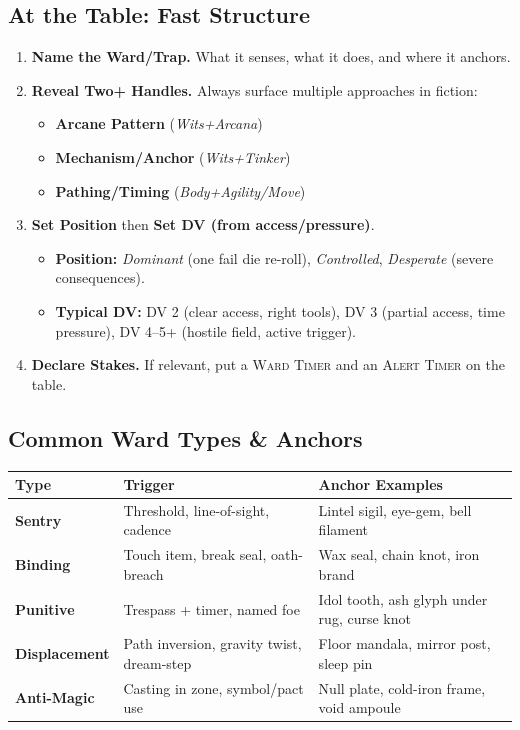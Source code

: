\subsection*{At the Table: Fast Structure}
\begin{enumerate}[label=\textbf{Step~\arabic*:}, leftmargin=2.1em]
    \item \textbf{Name the Ward/Trap.} What it senses, what it does, and where it anchors.
    \item \textbf{Reveal Two+ Handles.} Always surface multiple approaches in fiction:
        \begin{itemize}
            \item \textbf{Arcane Pattern} (\emph{Wits+Arcana})
            \item \textbf{Mechanism/Anchor} (\emph{Wits+Tinker})
            \item \textbf{Pathing/Timing} (\emph{Body+Agility/Move})
        \end{itemize}
    \item \textbf{Set Position} then \textbf{Set DV (from access/pressure)}.
        \begin{itemize}
            \item \textbf{Position:} \emph{Dominant} (one fail die re-roll), \emph{Controlled}, \emph{Desperate} (severe consequences).
            \item \textbf{Typical DV:} DV 2 (clear access, right tools), DV 3 (partial access, time pressure), DV 4--5+ (hostile field, active trigger).
        \end{itemize}
    \item \textbf{Declare Stakes.} If relevant, put a \textsc{Ward Timer } and an \textsc{Alert Timer } on the table.
\end{enumerate}

\subsection*{Common Ward Types \& Anchors}
\begin{tabularx}{\linewidth}{>{\bfseries}l X X}
\toprule
Type & Trigger & Anchor Examples \\
\midrule
Sentry & Threshold, line-of-sight, cadence & Lintel sigil, eye-gem, bell filament \\
Binding & Touch item, break seal, oath-breach & Wax seal, chain knot, iron brand \\
Punitive & Trespass + timer, named foe & Idol tooth, ash glyph under rug, curse knot \\
Displacement & Path inversion, gravity twist, dream-step & Floor mandala, mirror post, sleep pin \\
Anti-Magic & Casting in zone, symbol/pact use & Null plate, cold-iron frame, void ampoule \\
\bottomrule
\end{tabularx}

